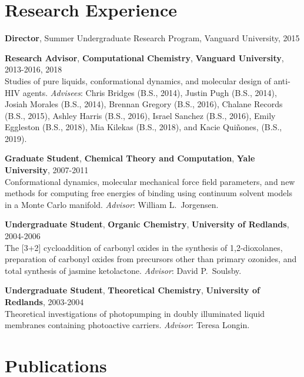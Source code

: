 \documentclass[10pt]{article}
\newcommand*\resitem[7]{\textbf{#1}, \textbf{#2}, \textbf{#3}, #4\\#5 \textit{#6}: #7}
\begin{document}
\section{Research Experience}


\textbf{Director}, Summer Undergraduate Research Program, Vanguard University, 2015 

\resitem{Research Advisor}{Computational Chemistry}{Vanguard University}{2013-2016, 2018}
{Studies of pure liquids, conformational dynamics, and molecular design of anti-HIV agents.}
{Advisees}{Chris Bridges (B.S., 2014), Justin Pugh (B.S., 2014), Josiah Morales (B.S., 2014), Brennan Gregory (B.S., 2016), Chalane Records (B.S., 2015), Ashley Harris (B.S., 2016),  Israel Sanchez (B.S., 2016), Emily Eggleston (B.S., 2018), Mia Kilekas (B.S., 2018), and Kacie Qui\~nones, (B.S., 2019).}

\resitem{Graduate Student}{Chemical Theory and Computation}{Yale University}{2007-2011}
{Conformational dynamics, molecular mechanical 
force field parameters, and new methods for computing free 
energies of binding using continuum solvent models in a Monte Carlo 
manifold.}{Advisor}{William L.\ Jorgensen.}

\resitem{Undergraduate Student}{Organic Chemistry}{University of Redlands}{2004-2006}
{The [3+2] cycloaddition of carbonyl oxides in the synthesis of 1,2-dioxolanes, 
preparation of carbonyl oxides from precursors other than primary ozonides, 
and total synthesis of jasmine ketolactone.}{Advisor}{David P.\ Soulsby.}

\resitem{Undergraduate Student}{Theoretical Chemistry}{University of Redlands}{2003-2004}
{Theoretical investigations of photopumping in doubly illuminated liquid membranes containing photoactive carriers.}{Advisor}
{Teresa Longin.}


\section{Publications}
\end{document}
